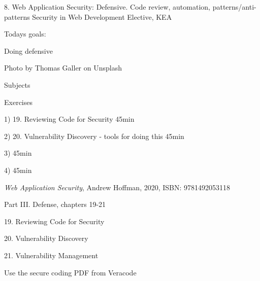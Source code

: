 \documentclass[Screen16to9,17pt]{foils}
\begin{document}
\mytitlepage
{8. Web Application Security: Defensive. Code review, automation, patterns/anti-patterns}
{Security in Web Development Elective, KEA}




Todays goals:
\begin{list2}
\item Doing defensive
\item
\end{list2}

Photo by Thomas Galler on Unsplash




\begin{list1}
\item Subjects
\begin{list2}
\item
\end{list2}
\item Exercises
\begin{list2}
\item
\end{list2}
\end{list1}


\begin{list2}
\item 1) 19. Reviewing Code for Security 45min
\item 2) 20. Vulnerability Discovery - tools for doing this 45min
\item 3)  45min
\item 4)  45min
\end{list2}




\emph{Web Application Security}, Andrew Hoffman, 2020, ISBN: 9781492053118

\begin{list1}
\item Part III. Defense, chapters 19-21
\item 19. Reviewing Code for Security
\item 20. Vulnerability Discovery
\item 21. Vulnerability Management
\item Use the secure coding PDF from Veracode
\end{list1}
\end{document}
